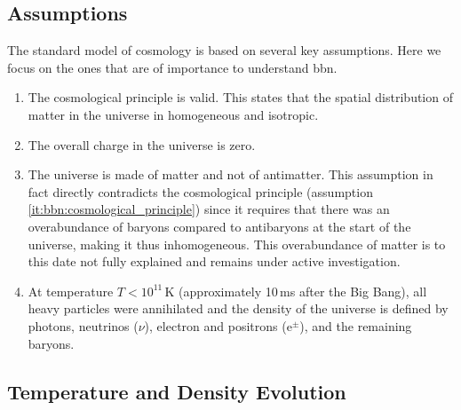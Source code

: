 \subsection{Assumptions}\label{sec:bbn:standard_model:assumptions}

The standard model of cosmology is based on several key assumptions. Here we focus on the ones that are of importance to understand \ac{bbn}.

\begin{enumerate}
    \item The cosmological principle is valid. This states that the spatial distribution of matter in the universe in homogeneous and isotropic. \label{it:bbn:cosmological_principle}
    \item The overall charge in the universe is zero.
    \item The universe is made of matter and not of antimatter. This assumption in fact directly contradicts the cosmological principle (assumption \ref{it:bbn:cosmological_principle}) since it requires that there was an overabundance of baryons compared to antibaryons at the start of the universe, making it thus inhomogeneous. This overabundance of matter is to this date not fully explained and remains under active investigation.
    \item At temperature $T<10^{11}$\,K (approximately 10\,ms after the Big Bang), all heavy particles were annihilated and the density of the universe is defined by photons, neutrinos ($\nu$), electron and positrons ($\mathrm{e}^{\pm}$), and the remaining baryons.
\end{enumerate}


\subsection{Temperature and Density Evolution}

